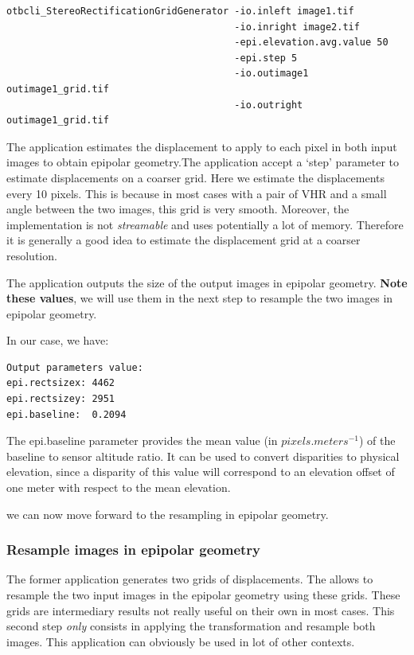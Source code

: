 \begin{verbatim}
otbcli_StereoRectificationGridGenerator -io.inleft image1.tif
                                        -io.inright image2.tif
                                        -epi.elevation.avg.value 50
                                        -epi.step 5
                                        -io.outimage1 outimage1_grid.tif
                                        -io.outright outimage1_grid.tif
\end{verbatim}

The application estimates the displacement to apply to each pixel in
both input images to obtain epipolar geometry.The application accept a
`step' parameter to estimate displacements on a coarser grid. Here we
estimate the displacements every 10 pixels. This is because in most
cases with a pair of VHR and a small angle between the two images,
this grid is very smooth. Moreover, the implementation is
not \textit{streamable} and uses potentially a lot of
memory. Therefore it is generally a good idea to estimate the
displacement grid at a coarser resolution.

The application outputs the size of the output images in epipolar
geometry. \textbf{Note these values}, we will use them in the next step to
resample the two images in epipolar geometry.

In our case, we have:

\begin{verbatim}
Output parameters value:
epi.rectsizex: 4462
epi.rectsizey: 2951
epi.baseline:  0.2094
\end{verbatim}

The epi.baseline parameter provides the mean value (in $pixels.meters^{-1}$) of the
baseline to sensor altitude ratio. It can be used to convert disparities to
physical elevation, since a disparity of this value will correspond to an
elevation offset of one meter with respect to the mean elevation.

we can now move forward to the resampling in epipolar geometry.

\subsubsection{Resample images in epipolar geometry}

The former application generates two grids of
displacements. The  allows to
resample the two input images in the epipolar geometry using these
grids. These grids are intermediary results not really useful on their
own in most cases. This second step \textit{only} consists in applying
the transformation and resample both images. This application can
obviously be used in lot of other contexts.

